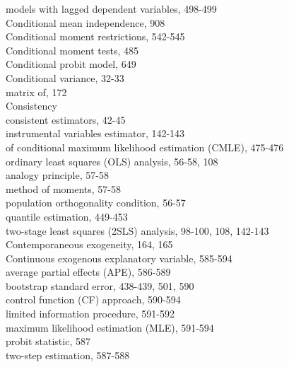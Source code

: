 \documentclass[10pt]{article}
\begin{document}
models with lagged dependent variables, 498-499\\
Conditional mean independence, 908\\
Conditional moment restrictions, 542-545\\
Conditional moment tests, 485\\
Conditional probit model, 649\\
Conditional variance, 32-33\\
matrix of, 172\\
Consistency\\
consistent estimators, 42-45\\
instrumental variables estimator, 142-143\\
of conditional maximum likelihood estimation (CMLE), 475-476\\
ordinary least squares (OLS) analysis, 56-58, 108\\
analogy principle, 57-58\\
method of moments, 57-58\\
population orthogonality condition, 56-57\\
quantile estimation, 449-453\\
two-stage least squares (2SLS) analysis, 98-100, 108, 142-143\\
Contemporaneous exogeneity, 164, 165\\
Continuous exogenous explanatory variable, 585-594\\
average partial effects (APE), 586-589\\
bootstrap standard error, 438-439, 501, 590\\
control function (CF) approach, 590-594\\
limited information procedure, 591-592\\
maximum likelihood estimation (MLE), 591-594\\
probit statistic, 587\\
two-step estimation, 587-588
\end{document}
